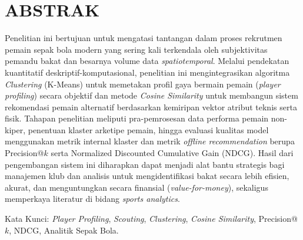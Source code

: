 \documentclass[12pt,a4paper]{report}
\begin{document}
\chapter*{ABSTRAK}

Penelitian ini bertujuan untuk mengatasi tantangan dalam proses rekrutmen pemain sepak bola modern yang sering kali terkendala oleh subjektivitas pemandu bakat dan besarnya volume data \emph{spatiotemporal}. Melalui pendekatan kuantitatif deskriptif-komputasional, penelitian ini mengintegrasikan algoritma \emph{Clustering} (K-Means) untuk memetakan profil gaya bermain pemain (\emph{player profiling}) secara objektif dan metode \emph{Cosine Similarity} untuk membangun sistem rekomendasi pemain alternatif berdasarkan kemiripan vektor atribut teknis serta fisik. Tahapan penelitian meliputi pra-pemrosesan data performa pemain non-kiper, penentuan klaster arketipe pemain, hingga evaluasi kualitas model menggunakan metrik internal klaster dan metrik \emph{offline recommendation} berupa Precision@$k$ serta Normalized Discounted Cumulative Gain (NDCG). Hasil dari pengembangan sistem ini diharapkan dapat menjadi alat bantu strategis bagi manajemen klub dan analisis untuk mengidentifikasi bakat secara lebih efisien, akurat, dan menguntungkan secara finansial (\emph{value-for-money}), sekaligus memperkaya literatur di bidang \emph{sports analytics}.

\vspace{1em}
\noindent Kata Kunci: \emph{Player Profiling}, \emph{Scouting}, \emph{Clustering}, \emph{Cosine Similarity}, Precision@$k$, NDCG, Analitik Sepak Bola.

\tableofcontents
\clearpage

\setcounter{page}{1}






\printbibliography[title={DAFTAR PUSTAKA}, heading=bibintoc]
\end{document}
